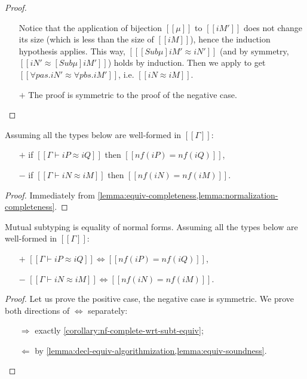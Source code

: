 \begin{proof}
\begin{itemize}
\begin{caseof}
  \label{lemma:poly-types-equivalence}
      Notice that the application of bijection $[[μ]]$ to $[[iM']]$ does
      not change its size (which is less than the size of $[[iM]]$), hence the induction hypothesis applies.
      This way, $[[ [Sub μ]iM' ≈ iN']]$ (and by symmetry, $[[iN' ≈ [Sub μ]iM']]$) holds by induction. 
      Then we apply  to get $[[∀pas.iN' ≈ ∀pbs.iM']]$, i.e. $[[iN ≈ iM]]$.
    \end{caseof}
      
\item[$+$] The proof is symmetric to the proof of the negative case.
  \end{itemize}
\end{proof}

\begin{corollary}
  \label{corollary:nf-complete-wrt-subt-equiv}
  Assuming all the types below are well-formed in $[[Γ]]$:
  \begin{itemize}
    \item [$+$] if $[[Γ ⊢ iP ≈ iQ]]$ then $[[nf(iP) = nf(iQ)]]$,
    \item [$-$] if $[[Γ ⊢ iN ≈ iM]]$ then $[[nf(iN) = nf(iM)]]$.
  \end{itemize}
\end{corollary}  
\begin{proof}
  Immediately from \cref{lemma:equiv-completeness,lemma:normalization-completeness}.
\end{proof}

\begin{lemma}
  \label{lemma:subt-equiv-algorithmization}
  Mutual subtyping is equality of normal forms.
 Assuming all the types below are well-formed in $[[Γ]]$:
  \begin{itemize}
    \item [$+$] $[[Γ ⊢ iP ≈ iQ]] \iff [[nf(iP) = nf(iQ)]]$,
    \item [$-$] $[[Γ ⊢ iN ≈ iM]] \iff [[nf(iN) = nf(iM)]]$.
  \end{itemize}
\end{lemma}
\begin{proof}
  Let us prove the positive case, the negative case is symmetric.
  We prove both directions of $\iff$ separately:
  \begin{itemize}
    \item [$\Rightarrow$] exactly \cref{corollary:nf-complete-wrt-subt-equiv};
    \item [$\Leftarrow$] by \cref{lemma:decl-equiv-algorithmization,lemma:equiv-soundness}.
  \end{itemize}
\end{proof}



